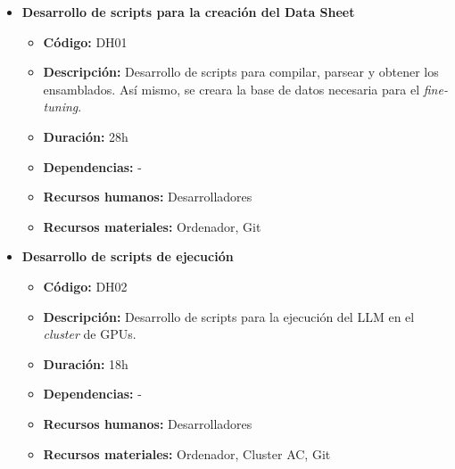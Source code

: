 \begin{itemize}
    \item \textbf{Desarrollo de scripts para la creación del Data Sheet}
        \begin{itemize}
            \item \textbf{Código:} DH01
            \item \textbf{Descripción:} Desarrollo de scripts para compilar, parsear y obtener los ensamblados. Así mismo, se creara la base de datos
                necesaria para el \textit{fine-tuning}.
            \item \textbf{Duración:} 28h
            \item \textbf{Dependencias:} -
            \item \textbf{Recursos humanos:} Desarrolladores
            \item \textbf{Recursos materiales:} Ordenador, Git
        \end{itemize}
    \item \textbf{Desarrollo de scripts de ejecución}
        \begin{itemize}
            \item \textbf{Código:} DH02
            \item \textbf{Descripción:} Desarrollo de scripts para la ejecución del LLM en el \textit{cluster} de GPUs.
            \item \textbf{Duración:} 18h
            \item \textbf{Dependencias:} -
            \item \textbf{Recursos humanos:} Desarrolladores
            \item \textbf{Recursos materiales:} Ordenador, Cluster AC, Git
        \end{itemize}
\end{itemize}
